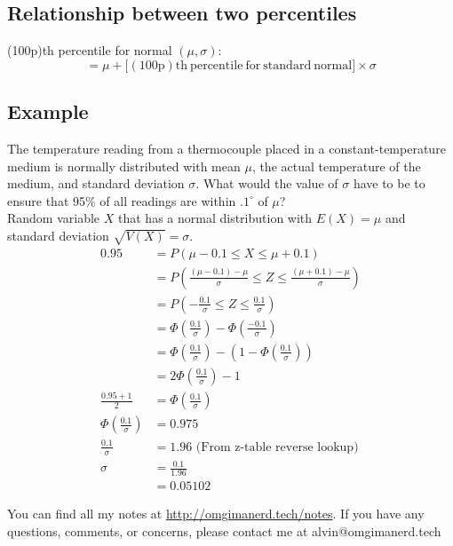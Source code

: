 \documentclass{math}
\begin{document}
\subsection*{Relationship between two percentiles}
(100p)th percentile for normal \( (\mu,\sigma) \):
\[ = \mu +\big[\mathrm{(100p)th\ percentile\ for\ standard\ normal}\big]
   \times\sigma \]

\subsection*{Example}
The temperature reading from a thermocouple placed in a constant-temperature
medium is normally distributed with mean \( \mu \), the actual temperature
of the medium, and standard deviation \( \sigma \). What would the value of
\( \sigma \) have to be to ensure that 95\% of all readings are within
\( .1^{\circ} \) of \( \mu \)? \\
Random variable \( X \) that has a normal distribution with \( E(X) = \mu \)
and standard deviation \( \sqrt{V(X)} = \sigma \).
\begin{align*}
  0.95 &= P(\mu-0.1\leq X\leq\mu+0.1) \\
  &= P(\frac{(\mu-0.1)-\mu}{\sigma}\leq Z\leq\frac{(\mu+0.1)-\mu}{\sigma}) \\
  &= P\left(-\frac{0.1}{\sigma}\leq Z\leq\frac{0.1}{\sigma}\right) \\
  &= \Phi\left(\frac{0.1}{\sigma}\right)-\Phi\left(\frac{-0.1}{\sigma}\right) \\
  &= \Phi\left(\frac{0.1}{\sigma}\right)-
    \left(1-\Phi\left(\frac{0.1}{\sigma}\right)\right) \\
  &= 2\Phi\left(\frac{0.1}{\sigma}\right)-1 \\
  \frac{0.95+1}{2} &= \Phi\left(\frac{0.1}{\sigma}\right) \\
  \Phi(\frac{0.1}{\sigma}) &= 0.975 \\
  \frac{0.1}{\sigma} &= 1.96 \textrm{  (From z-table reverse lookup)}\\
  \sigma &= \frac{0.1}{1.96} \\
  &= 0.05102
\end{align*}

\begin{center}
  You can find all my notes at \url{http://omgimanerd.tech/notes}. If you have
  any questions, comments, or concerns, please contact me at
  alvin@omgimanerd.tech
\end{center}
\end{document}
